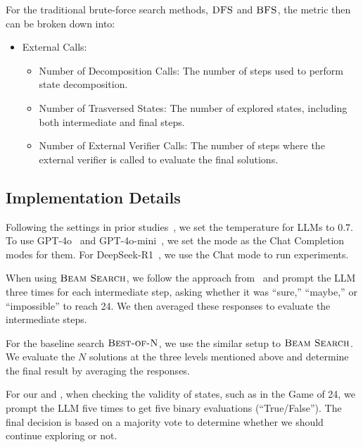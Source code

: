 For the traditional brute-force search methods, $\textsc{DFS}$ and $\textsc{BFS}$, the metric then can be broken down into:
\begin{itemize}
    \item External Calls:
    \begin{itemize}
    \item Number of Decomposition Calls: The number of steps used to perform state decomposition.
    \item Number of Trasversed States: The number of explored states, including both intermediate and final steps.
    \item Number of External Verifier Calls: The number of steps where the external verifier is called to evaluate the final solutions.
\end{itemize}

\end{itemize}
\subsection{Implementation Details}
\label{appendix:implementation_details}
Following the settings in prior studies~\cite{yao2023tree, hao2023reasoning, snell2024scaling}, we set the temperature for LLMs to $\num{0.7}$. To use GPT-4o~\cite{gpt4ocard} and GPT-4o-mini~\cite{achiam2023gpt}, we set the mode as the Chat Completion modes for them. For DeepSeek-R1~\cite{deepseekai2025deepseekr1}, we use the Chat mode to run experiments. 

When using $\textsc{Beam Search}$, we follow the approach from~\cite{yao2023tree} and prompt the LLM three times for each intermediate step, asking whether it was ``sure,'' ``maybe,'' or ``impossible'' to reach 24. We then averaged these responses to evaluate the intermediate steps.

For the baseline search $\textsc{Best-of-N}$, we use the similar setup to $\textsc{Beam Search}$. We evaluate the $N$ solutions at the three levels mentioned above and determine the final result by averaging the responses.

For our \method and \cmethod, when checking the validity of states, such as in the Game of 24, we prompt the LLM five times to get five binary evaluations (``True/False''). The final decision is based on a majority vote to determine whether we should continue exploring or not.

